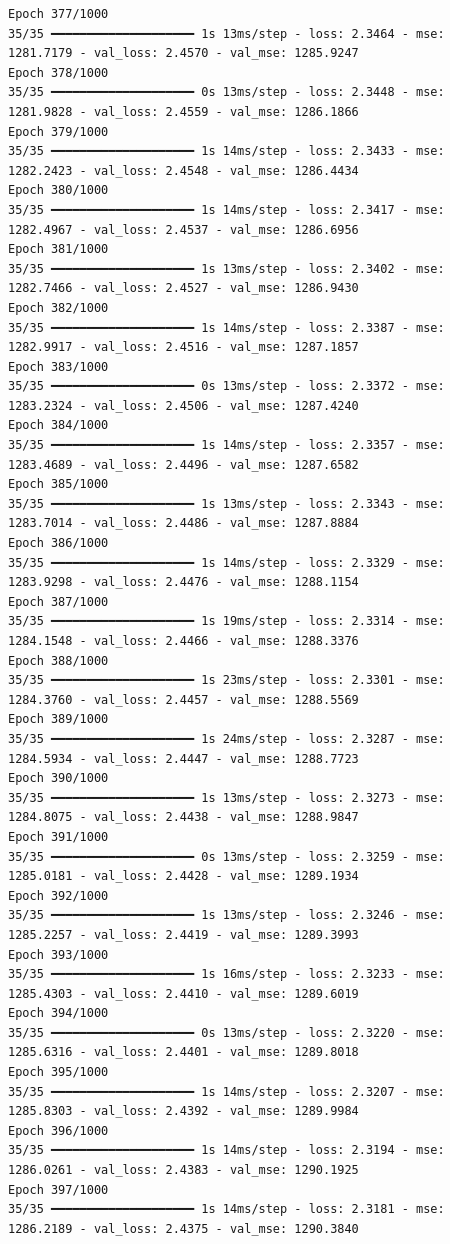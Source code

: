 \documentclass[
  letterpaper,
  DIV=11,
  numbers=noendperiod]{scrreprt}
\begin{document}
\begin{verbatim}
Epoch 377/1000
35/35 ━━━━━━━━━━━━━━━━━━━━ 1s 13ms/step - loss: 2.3464 - mse: 1281.7179 - val_loss: 2.4570 - val_mse: 1285.9247
Epoch 378/1000
35/35 ━━━━━━━━━━━━━━━━━━━━ 0s 13ms/step - loss: 2.3448 - mse: 1281.9828 - val_loss: 2.4559 - val_mse: 1286.1866
Epoch 379/1000
35/35 ━━━━━━━━━━━━━━━━━━━━ 1s 14ms/step - loss: 2.3433 - mse: 1282.2423 - val_loss: 2.4548 - val_mse: 1286.4434
Epoch 380/1000
35/35 ━━━━━━━━━━━━━━━━━━━━ 1s 14ms/step - loss: 2.3417 - mse: 1282.4967 - val_loss: 2.4537 - val_mse: 1286.6956
Epoch 381/1000
35/35 ━━━━━━━━━━━━━━━━━━━━ 1s 13ms/step - loss: 2.3402 - mse: 1282.7466 - val_loss: 2.4527 - val_mse: 1286.9430
Epoch 382/1000
35/35 ━━━━━━━━━━━━━━━━━━━━ 1s 14ms/step - loss: 2.3387 - mse: 1282.9917 - val_loss: 2.4516 - val_mse: 1287.1857
Epoch 383/1000
35/35 ━━━━━━━━━━━━━━━━━━━━ 0s 13ms/step - loss: 2.3372 - mse: 1283.2324 - val_loss: 2.4506 - val_mse: 1287.4240
Epoch 384/1000
35/35 ━━━━━━━━━━━━━━━━━━━━ 1s 14ms/step - loss: 2.3357 - mse: 1283.4689 - val_loss: 2.4496 - val_mse: 1287.6582
Epoch 385/1000
35/35 ━━━━━━━━━━━━━━━━━━━━ 1s 13ms/step - loss: 2.3343 - mse: 1283.7014 - val_loss: 2.4486 - val_mse: 1287.8884
Epoch 386/1000
35/35 ━━━━━━━━━━━━━━━━━━━━ 1s 14ms/step - loss: 2.3329 - mse: 1283.9298 - val_loss: 2.4476 - val_mse: 1288.1154
Epoch 387/1000
35/35 ━━━━━━━━━━━━━━━━━━━━ 1s 19ms/step - loss: 2.3314 - mse: 1284.1548 - val_loss: 2.4466 - val_mse: 1288.3376
Epoch 388/1000
35/35 ━━━━━━━━━━━━━━━━━━━━ 1s 23ms/step - loss: 2.3301 - mse: 1284.3760 - val_loss: 2.4457 - val_mse: 1288.5569
Epoch 389/1000
35/35 ━━━━━━━━━━━━━━━━━━━━ 1s 24ms/step - loss: 2.3287 - mse: 1284.5934 - val_loss: 2.4447 - val_mse: 1288.7723
Epoch 390/1000
35/35 ━━━━━━━━━━━━━━━━━━━━ 1s 13ms/step - loss: 2.3273 - mse: 1284.8075 - val_loss: 2.4438 - val_mse: 1288.9847
Epoch 391/1000
35/35 ━━━━━━━━━━━━━━━━━━━━ 0s 13ms/step - loss: 2.3259 - mse: 1285.0181 - val_loss: 2.4428 - val_mse: 1289.1934
Epoch 392/1000
35/35 ━━━━━━━━━━━━━━━━━━━━ 1s 13ms/step - loss: 2.3246 - mse: 1285.2257 - val_loss: 2.4419 - val_mse: 1289.3993
Epoch 393/1000
35/35 ━━━━━━━━━━━━━━━━━━━━ 1s 16ms/step - loss: 2.3233 - mse: 1285.4303 - val_loss: 2.4410 - val_mse: 1289.6019
Epoch 394/1000
35/35 ━━━━━━━━━━━━━━━━━━━━ 0s 13ms/step - loss: 2.3220 - mse: 1285.6316 - val_loss: 2.4401 - val_mse: 1289.8018
Epoch 395/1000
35/35 ━━━━━━━━━━━━━━━━━━━━ 1s 14ms/step - loss: 2.3207 - mse: 1285.8303 - val_loss: 2.4392 - val_mse: 1289.9984
Epoch 396/1000
35/35 ━━━━━━━━━━━━━━━━━━━━ 1s 14ms/step - loss: 2.3194 - mse: 1286.0261 - val_loss: 2.4383 - val_mse: 1290.1925
Epoch 397/1000
35/35 ━━━━━━━━━━━━━━━━━━━━ 1s 14ms/step - loss: 2.3181 - mse: 1286.2189 - val_loss: 2.4375 - val_mse: 1290.3840

\end{verbatim}
\end{document}
